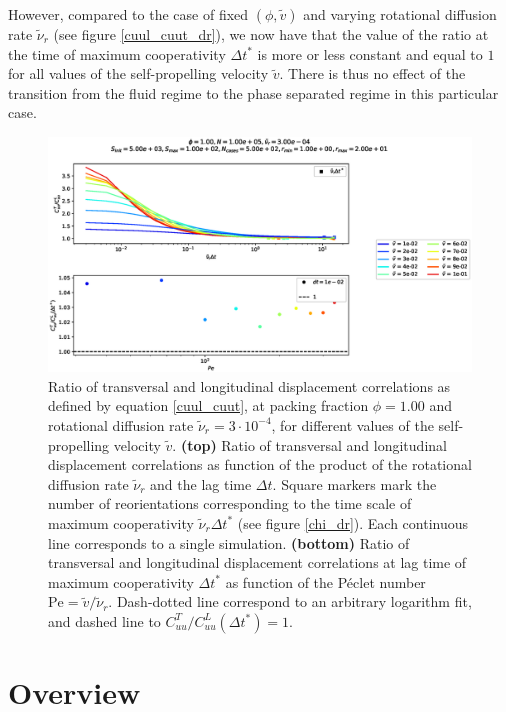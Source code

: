 \documentclass[class=report, float=false, crop=false]{standalone}
\begin{document}
However, compared to the case of fixed $(\phi, \tilde{v})$ and varying rotational diffusion rate $\tilde{\nu}_r$ (see figure \ref{cuul_cuut_dr}), we now have that the value of the ratio at the time of maximum cooperativity $\Delta t^*$ is more or less constant and equal to $1$ for all values of the self-propelling velocity $\tilde{v}$. There is thus no effect of the transition from the fluid regime to the phase separated regime in this particular case.

\begin{figure}[h!]
\centering
\includegraphics[width=\textwidth]{figures/figs/CuuLCuuT_Dl1000_Rh3000_Nq1000_Io5000_Mn1000_Cn5000.eps}
\caption{Ratio of transversal and longitudinal displacement correlations as defined by equation \ref{cuul_cuut}, at packing fraction $\phi=1.00$ and rotational diffusion rate $\tilde{\nu}_r=3\cdot10^{-4}$, for different values of the self-propelling velocity $\tilde{v}$. \textbf{(top)} Ratio of transversal and longitudinal displacement correlations as function of the product of the rotational diffusion rate $\tilde{\nu}_r$ and the lag time $\Delta t$. Square markers mark the number of reorientations corresponding to the time scale of maximum cooperativity $\tilde{\nu}_r \Delta t^*$ (see figure \ref{chi_dr}). Each continuous line corresponds to a single simulation. \textbf{(bottom)} Ratio of transversal and longitudinal displacement correlations at lag time of maximum cooperativity $\Delta t^*$ as function of the P\'eclet number $\text{Pe}=\tilde{v}/\tilde{\nu}_r$. Dash-dotted line correspond to an arbitrary logarithm fit, and dashed line to $C_{uu}^T/C_{uu}^L(\Delta t^*) = 1$.}
\label{cuul_cuut_v}
\end{figure}

\newpage
\section{Overview}
\end{document}
